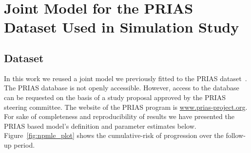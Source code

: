 \section{Joint Model for the PRIAS Dataset Used in Simulation Study}
\label{sec:param_estimates_jm_fit_prias}
\subsection{Dataset}
In this work we reused a joint model we previously fitted to the PRIAS dataset~\citep{tomer2019personalized,tomer2020webapp}. The PRIAS database is not openly accessible. However, access to the database can be requested on the basis of a study proposal approved by the PRIAS steering committee. The website of the PRIAS program is \url{www.prias-project.org}. For sake of completeness and reproducibility of results we have presented the PRIAS based model's definition and parameter estimates below. Figure~\ref{fig:npmle_plot} shows the cumulative-risk of progression over the follow-up period.

